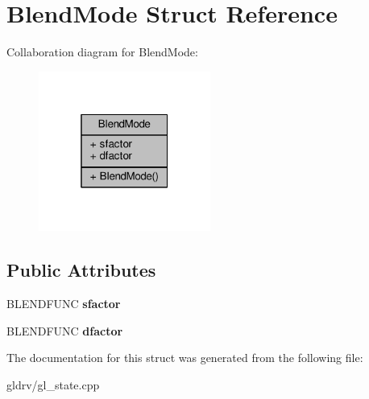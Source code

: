 \hypertarget{structBlendMode}{}\section{Blend\+Mode Struct Reference}
\label{structBlendMode}


Collaboration diagram for Blend\+Mode\+:
\nopagebreak
\begin{figure}[H]
\begin{center}
\leavevmode
\includegraphics[width=160pt]{dd/d5e/structBlendMode__coll__graph}
\end{center}
\end{figure}
\subsection*{Public Attributes}
\begin{DoxyCompactItemize}
\item 
B\+L\+E\+N\+D\+F\+U\+NC {\bfseries sfactor}\hypertarget{structBlendMode_a23a7824c88af4f92931e9240424ef1f6}{}\label{structBlendMode_a23a7824c88af4f92931e9240424ef1f6}

\item 
B\+L\+E\+N\+D\+F\+U\+NC {\bfseries dfactor}\hypertarget{structBlendMode_aefec8fe078913d0f94362440e5aa2162}{}\label{structBlendMode_aefec8fe078913d0f94362440e5aa2162}

\end{DoxyCompactItemize}


The documentation for this struct was generated from the following file\+:\begin{DoxyCompactItemize}
\item 
gldrv/gl\+\_\+state.\+cpp\end{DoxyCompactItemize}
